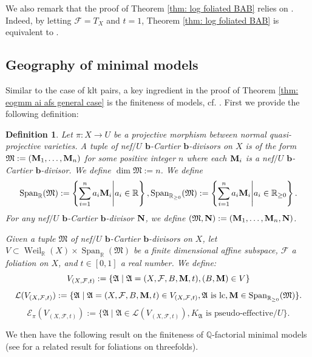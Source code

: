 \documentclass[12pt]{amsart}
\numberwithin{equation}{section}
\newcommand{\bb}{\bm{b}}
\newcommand{\Mm}{{\bf{M}}}
\newcommand{\NN}{{\bf{N}}}
\newcommand{\Span}{\operatorname{Span}}
\newcommand{\Weil}{\operatorname{Weil}}
\newcommand{\Aa}{{\mathfrak{A}}}
\newcommand{\Ff}{\mathcal{F}}
\newcommand{\MM}{{\mathfrak{M}}}
\newtheorem{defnsub}[thmsub]{Definition}
\theoremstyle{definition}
\theoremstyle{definition}
\theoremstyle{definition}
\begin{document}
We also remark that the proof of Theorem \ref{thm: log foliated BAB} relies on \cite{Bir21}. Indeed, by letting $\Ff=T_X$ and $t=1$, Theorem \ref{thm: log foliated BAB} is equivalent to \cite[Theorem 1.1]{Bir21}. 




\subsection{Geography of minimal models}

Similar to the case of klt pairs, a key ingredient in the proof of Theorem \ref{thm: eogmm ai afs general case} is the finiteness of models, cf. \cite[Theorem E]{BCHM10}. 
First we provide the following definition:

\begin{defnsub}\label{defn: polytope afs}
Let $\pi\colon X\rightarrow U$ be a projective morphism between normal quasi-projective varieties. A \emph{tuple} of nef$/U$ $\bb$-Cartier $\bb$-divisors on $X$ is of the form $\MM:=(\Mm_1,\dots,\Mm_n)$ for some positive integer $n$ where each $\Mm_i$ is a nef$/U$ $\bb$-Cartier $\bb$-divisor. We define $\dim\MM:=n$. We define
$$\Span_{\mathbb R}(\MM):=\left\{\sum_{i=1}^n a_i\Mm_i\middle| a_i\in\mathbb R\right\}, \Span_{\mathbb R_{\geq 0}}(\MM):=\left\{\sum_{i=1}^n a_i\Mm_i\middle| a_i\in\mathbb R_{\geq 0}\right\}.$$
For any nef$/U$ $\bb$-Cartier $\bb$-divisor $\NN$, we define $(\MM,\NN):=(\Mm_1,\dots,\Mm_n,\NN)$.

Given a tuple $\MM$ of nef$/U$ $\bb$-Cartier $\bb$-divisors on $X$, let $V\subset\Weil_{\mathbb R}(X)\times\Span_{\mathbb R}(\MM)$ be a finite dimensional affine subspace, $\Ff$ a foliation on $X$, and $t\in [0,1]$ a real number. We define:
    $$V_{(X,\Ff,t)}:=\{\Aa\mid \Aa=(X,\Ff,B,\Mm,t),(B,\Mm)\in V\}$$
    $$\mathcal{L}(V_{(X,\Ff,t)}):=\{\Aa \mid \Aa=(X,\Ff,B,\Mm,t)\in V_{(X,\Ff,t)},\Aa\text{ is lc},\Mm\in\Span_{\mathbb R_{\geq 0}}(\MM)\}.$$
    $$\mathcal{E}_{\pi}(V_{(X,\Ff,t)}):=\{\Aa\mid\Aa\in \mathcal{L}(V_{(X,\Ff,t)}), K_{\Aa}\text{ is pseudo-effective}/U\}.$$
\end{defnsub}

We then have the following result on the finiteness of $\mathbb Q$-factorial minimal models (see \cite[Theorem 3.2]{Mas24} for a related result for foliations on threefolds). 
\end{document}
